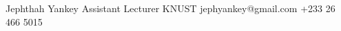 %
%
%


\begin{referees}
		{Jephthah Yankey}
		{Assistant Lecturer}
		{KNUST}
		{jephyankey@gmail.com}
		{+233 26 466 5015}
\end{referees}

